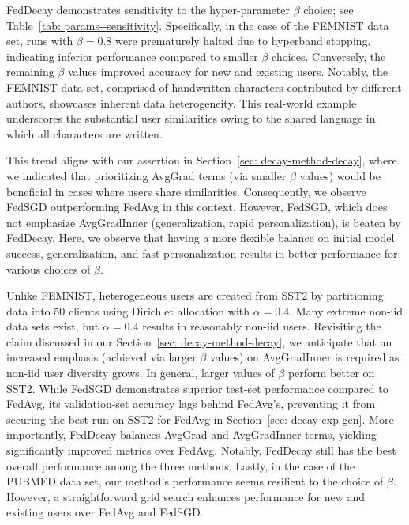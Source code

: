 FedDecay demonstrates sensitivity to the hyper-parameter $\beta$ choice; see Table~\ref{tab: params--sensitivity}.
Specifically, in the case of the FEMNIST data set, runs with $\beta = 0.8$ were prematurely halted due to hyperband stopping, indicating inferior performance compared to smaller $\beta$ choices.
Conversely, the remaining $\beta$ values improved accuracy for new and existing users.
Notably, the FEMNIST data set, comprised of handwritten characters contributed by different authors, showcases inherent data heterogeneity.
This real-world example underscores the substantial user similarities owing to the shared language in which all characters are written.


This trend aligns with our assertion in Section~\ref{sec: decay-method-decay}, where we indicated that prioritizing AvgGrad terms (via smaller $\beta$ values) would be beneficial in cases where users share similarities.
Consequently, we observe FedSGD outperforming FedAvg in this context.
However, FedSGD, which does not emphasize AvgGradInner (generalization, rapid personalization), is beaten by FedDecay.
Here, we observe that having a more flexible balance on initial model success, generalization, and fast personalization results in better performance for various choices of $\beta$.

Unlike FEMNIST, heterogeneous users are created from SST2 by partitioning data into 50 clients using Dirichlet allocation with $\alpha = 0.4$.
Many extreme non-iid data sets exist, but $\alpha = 0.4$ results in reasonably non-iid users.
Revisiting the claim discussed in our Section~\ref{sec: decay-method-decay}, we anticipate that an increased emphasis (achieved via larger $\beta$ values) on AvgGradInner is required as non-iid user diversity grows.
In general, larger values of $\beta$ perform better on SST2.
While FedSGD demonstrates superior test-set performance compared to FedAvg, its validation-set accuracy lags behind FedAvg's, preventing it from securing the best run on SST2 for FedAvg in Section~\ref{sec: decay-exp-gen}. 
More importantly, FedDecay balances AvgGrad and AvgGradInner terms, yielding significantly improved metrics over FedAvg.
Notably, FedDecay still has the best overall performance among the three methods.
Lastly, in the case of the PUBMED data set, our method's performance seems resilient to the choice of $\beta$.
However, a straightforward grid search enhances performance for new and existing users over FedAvg and FedSGD.

